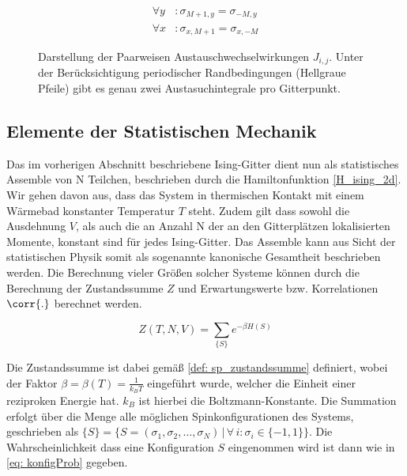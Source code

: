 \begin{equation} \label{eq: Periodische Randbedingungen}
\begin{aligned} 
\forall y & : \sigma_{M+1, y} =  \sigma_{-M, y} \\
\forall x & : \sigma_{x, M+1} =  \sigma_{x, -M}
\end{aligned}
\end{equation}

\begin{figure}[h]
    \centering
    
    \caption{Darstellung der Paarweisen Austauschwechselwirkungen $J_{i,j}$. Unter der Berücksichtigung periodischer Randbedingungen (Hellgraue Pfeile) gibt es genau zwei Austasuchintegrale pro Gitterpunkt.}  \label{Abb: grid}
\end{figure}

\subsection{Elemente der Statistischen Mechanik}

Das im vorherigen Abschnitt beschriebene Ising-Gitter dient nun als statistisches Assemble von N Teilchen, beschrieben durch die Hamiltonfunktion \eqref{H_ising_2d}. Wir gehen davon aus, dass das System in thermischen Kontakt mit einem Wärmebad konstanter Temperatur $T$ steht. Zudem gilt dass sowohl die Ausdehnung $V$, als auch die an Anzahl N der an den Gitterplätzen lokalisierten Momente, konstant sind für jedes Ising-Gitter. Das Assemble kann aus Sicht der statistischen Physik somit als sogenannte kanonische Gesamtheit beschrieben werden. Die Berechnung vieler Größen solcher Systeme können durch die Berechnung der Zustandssumme $Z$ und Erwartungswerte bzw. Korrelationen $\corr{.}$ berechnet werden.

\begin{equation} \label{def: sp_zustandssumme}
 Z(T,N,V) = \sum_{\{S\}} e^{-\beta H( S ) } 
\end{equation}

\noindent Die Zustandssumme ist dabei gemäß \eqref{def: sp_zustandssumme} definiert, wobei der Faktor $\beta = \beta\left(T\right) = \frac{1}{k_B T} $ eingeführt wurde, welcher die Einheit einer reziproken Energie hat. $k_B$ ist hierbei die Boltzmann-Konstante. Die Summation erfolgt über die Menge alle möglichen Spinkonfigurationen des Systems, geschrieben als $\{S\} = \{S = (\sigma_1, \sigma_2, \dots,\sigma_N) \,\vert\, \forall\,i : \sigma_i \in \{-1, 1\}\}$. Die Wahrscheinlichkeit dass eine Konfiguration $S$ eingenommen wird ist dann wie in \eqref{eq: konfigProb} gegeben.

